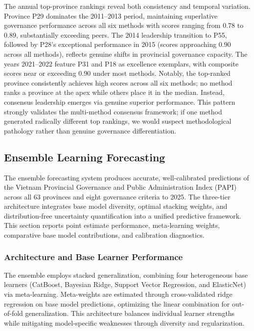 \documentclass[12pt,a4paper]{article}
\begin{document}
The annual top-province rankings reveal both consistency and temporal variation. Province P29 dominates the 2011--2013 period, maintaining superlative governance performance across all six methods with scores ranging from 0.78 to 0.89, substantially exceeding peers. The 2014 leadership transition to P55, followed by P28's exceptional performance in 2015 (scores approaching 0.90 across all methods), reflects genuine shifts in provincial governance capacity. The years 2021--2022 feature P31 and P18 as excellence exemplars, with composite scores near or exceeding 0.90 under most methods. Notably, the top-ranked province consistently achieves high scores across all six methods; no method ranks a province at the apex while others place it in the median. Instead, consensus leadership emerges via genuine superior performance. This pattern strongly validates the multi-method consensus framework; if one method generated radically different top rankings, we would suspect methodological pathology rather than genuine governance differentiation.

\subsection{Ensemble Learning Forecasting}
\label{subsec:results_forecast}

The ensemble forecasting system produces accurate, well-calibrated predictions of the Vietnam Provincial Governance and Public Administration Index (PAPI) across all 63 provinces and eight governance criteria to 2025. The three-tier architecture integrates base model diversity, optimal stacking weights, and distribution-free uncertainty quantification into a unified predictive framework. This section reports point estimate performance, meta-learning weights, comparative base model contributions, and calibration diagnostics.

\subsubsection{Architecture and Base Learner Performance}

The ensemble employs stacked generalization, combining four heterogeneous base learners (CatBoost, Bayesian Ridge, Support Vector Regression, and ElasticNet) via meta-learning. Meta-weights are estimated through cross-validated ridge regression on base model predictions, optimizing the linear combination for out-of-fold generalization. This architecture balances individual learner strengths while mitigating model-specific weaknesses through diversity and regularization.
\end{document}
